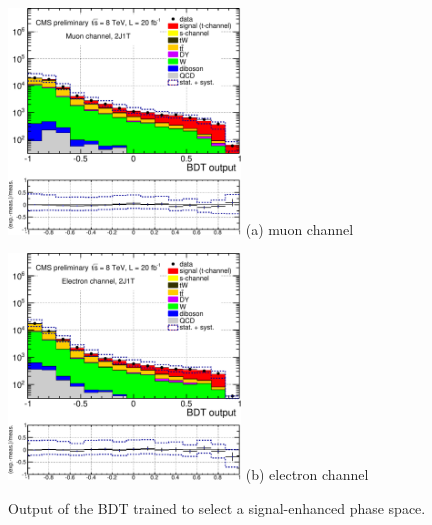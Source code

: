 \documentclass[a4paper]{jpconf}
\begin{document}
\begin{figure}[h]
\begin{center}
\begin{minipage}{7cm}
\includegraphics[height=6.0cm]{mva_bdt_mu-crop}
\center (a) muon channel
\end{minipage}\hspace{1cm}%
\begin{minipage}{7cm}
\includegraphics[height=6.0cm]{mva_bdt_el-crop}
\center (b) electron channel
\end{minipage} 
\caption{\label{fig:bdt}Output of the BDT trained to select a signal-enhanced phase space.}
\end{center}
\end{figure}
\end{document}
